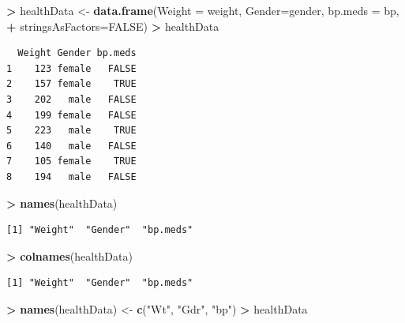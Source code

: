 \documentclass[]{krantz}
\makeatletter
\newenvironment{Shaded}{\begin{snugshade}}{\end{snugshade}}
\newcommand{\KeywordTok}[1]{\textcolor[rgb]{0.27,0.27,0.27}{\textbf{#1}}}
\newcommand{\DataTypeTok}[1]{\textcolor[rgb]{0.27,0.27,0.27}{#1}}
\newcommand{\StringTok}[1]{\textcolor[rgb]{0.5,0.5,0.5}{#1}}
\newcommand{\OtherTok}[1]{\textcolor[rgb]{0.37,0.37,0.37}{#1}}
\newcommand{\OperatorTok}[1]{\textcolor[rgb]{0.43,0.43,0.43}{\textbf{#1}}}
\newcommand{\NormalTok}[1]{#1}
\newenvironment{kframe}{%
\medskip{}
\setlength{\fboxsep}{.8em}
 \def\at@end@of@kframe{}%
 \ifinner\ifhmode%
  \def\at@end@of@kframe{\end{minipage}}%
  \begin{minipage}{\columnwidth}%
 \fi\fi%
 \def\FrameCommand##1{\hskip\@totalleftmargin \hskip-\fboxsep
 \colorbox{shadecolor}{##1}\hskip-\fboxsep
     \hskip-\linewidth \hskip-\@totalleftmargin \hskip\columnwidth}%
 \MakeFramed {\advance\hsize-\width
   \@totalleftmargin\z@ \linewidth\hsize
   \@setminipage}}%
 {\par\unskip\endMakeFramed%
 \at@end@of@kframe}
\renewenvironment{Shaded}{\begin{kframe}}{\end{kframe}}
\makeatother
\begin{document}
\begin{Shaded}
\begin{Highlighting}[]
\OperatorTok{>}\StringTok{ }\NormalTok{healthData <-}\StringTok{ }\KeywordTok{data.frame}\NormalTok{(}\DataTypeTok{Weight =}\NormalTok{ weight, }\DataTypeTok{Gender=}\NormalTok{gender, }\DataTypeTok{bp.meds =}\NormalTok{ bp,}
\OperatorTok{+}\StringTok{                          }\DataTypeTok{stringsAsFactors=}\OtherTok{FALSE}\NormalTok{)}
\OperatorTok{>}\StringTok{ }\NormalTok{healthData}
\end{Highlighting}
\end{Shaded}

\begin{verbatim}
  Weight Gender bp.meds
1    123 female   FALSE
2    157 female    TRUE
3    202   male   FALSE
4    199 female   FALSE
5    223   male    TRUE
6    140   male   FALSE
7    105 female    TRUE
8    194   male   FALSE
\end{verbatim}

\begin{Shaded}
\begin{Highlighting}[]
\OperatorTok{>}\StringTok{ }\KeywordTok{names}\NormalTok{(healthData)}
\end{Highlighting}
\end{Shaded}

\begin{verbatim}
[1] "Weight"  "Gender"  "bp.meds"
\end{verbatim}

\begin{Shaded}
\begin{Highlighting}[]
\OperatorTok{>}\StringTok{ }\KeywordTok{colnames}\NormalTok{(healthData)}
\end{Highlighting}
\end{Shaded}

\begin{verbatim}
[1] "Weight"  "Gender"  "bp.meds"
\end{verbatim}

\begin{Shaded}
\begin{Highlighting}[]
\OperatorTok{>}\StringTok{ }\KeywordTok{names}\NormalTok{(healthData) <-}\StringTok{ }\KeywordTok{c}\NormalTok{(}\StringTok{"Wt"}\NormalTok{, }\StringTok{"Gdr"}\NormalTok{, }\StringTok{"bp"}\NormalTok{)}
\OperatorTok{>}\StringTok{ }\NormalTok{healthData}
\end{Highlighting}
\end{Shaded}
\end{document}
